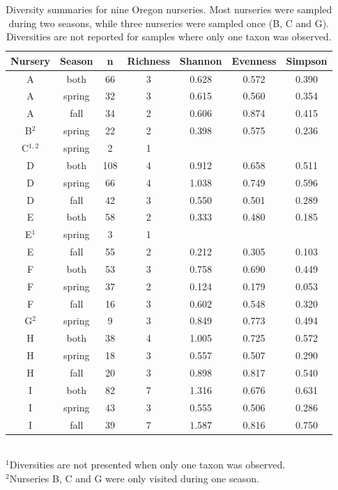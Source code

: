 \documentclass[12pt]{article}
\begin{document}
\begin{table}[ht]
\centering
\caption{Diversity summaries for nine Oregon nurseries.  Most nurseries were sampled during two seasons, while three nurseries were sampled once (B, C and G). Diversities are not reported for samples where only one taxon was observed.} 
\label{tab:div}
\begin{tabular}{ccccccc}
  \hline
 \textbf{Nursery} &  \textbf{Season} & \textbf{n} & \textbf{Richness} & \textbf{Shannon} & \textbf{Evenness} & \textbf{Simpson} \\ 
  \hline
  \rowcolor{gray!20}
  A & both & 66 & 3 & 0.628 & 0.572 & 0.390 \\ 
  A & spring & 32 & 3 & 0.615 & 0.560 & 0.354 \\ 
  A & fall & 34 & 2 & 0.606 & 0.874 & 0.415 \\ 
  B$^{2}$ & spring & 22 & 2 & 0.398 & 0.575 & 0.236 \\ 
  C$^{1,2}$ & spring & 2 & 1 &  &  &  \\ 
  \rowcolor{gray!20}
  D & both & 108 & 4 & 0.912 & 0.658 & 0.511 \\ 
  D & spring & 66 & 4 & 1.038 & 0.749 & 0.596 \\ 
  D & fall & 42 & 3 & 0.550 & 0.501 & 0.289 \\ 
  \rowcolor{gray!20}
  E & both & 58 & 2 & 0.333 & 0.480 & 0.185 \\ 
  E$^{1}$ & spring & 3 & 1 &  &  &  \\ 
  E & fall & 55 & 2 & 0.212 & 0.305 & 0.103 \\ 
  \rowcolor{gray!20}
  F & both & 53 & 3 & 0.758 & 0.690 & 0.449 \\ 
  F & spring & 37 & 2 & 0.124 & 0.179 & 0.053 \\ 
  F & fall & 16 & 3 & 0.602 & 0.548 & 0.320 \\ 
  G$^{2}$ & spring & 9 & 3 & 0.849 & 0.773 & 0.494 \\ 
  \rowcolor{gray!20}
  H & both & 38 & 4 & 1.005 & 0.725 & 0.572 \\ 
  H & spring & 18 & 3 & 0.557 & 0.507 & 0.290 \\ 
  H & fall & 20 & 3 & 0.898 & 0.817 & 0.540 \\ 
  \rowcolor{gray!20}
  I & both & 82 & 7 & 1.316 & 0.676 & 0.631 \\ 
  I & spring & 43 & 3 & 0.555 & 0.506 & 0.286 \\ 
  I & fall & 39 & 7 & 1.587 & 0.816 & 0.750 \\ 
   \hline
\end{tabular}
\\
\vspace{12pt}
$^{1}$Diversities are not presented when only one taxon was observed. \\
$^{2}$Nurseries B, C and G were only visited during one season.
\end{table}
\end{document}
